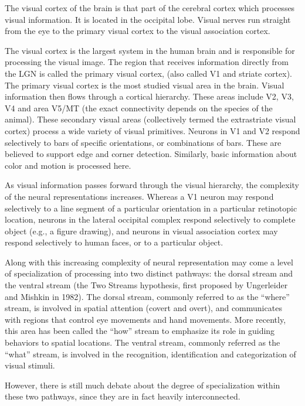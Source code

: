 \documentclass[]{book}
\begin{document}
The visual cortex of the brain is that part of the cerebral cortex which processes visual information. It is located in the occipital lobe. Visual nerves run straight from the eye to the primary visual cortex to the visual association cortex.

The visual cortex is the largest system in the human brain and is responsible for processing the visual image. The region that receives information directly from the LGN is called the primary visual cortex, (also called V1 and striate cortex). The primary visual cortex is the most studied visual area in the brain. Visual information then flows through a cortical hierarchy. These areas include V2, V3, V4 and area V5/MT (the exact connectivity depends on the species of the animal). These secondary visual areas (collectively termed the extrastriate visual cortex) process a wide variety of visual primitives. Neurons in V1 and V2 respond selectively to bars of specific orientations, or combinations of bars. These are believed to support edge and corner detection. Similarly, basic information about color and motion is processed here.

As visual information passes forward through the visual hierarchy, the complexity of the neural representations increases. Whereas a V1 neuron may respond selectively to a line segment of a particular orientation in a particular retinotopic location, neurons in the lateral occipital complex respond selectively to complete object (e.g., a figure drawing), and neurons in visual association cortex may respond selectively to human faces, or to a particular object.

Along with this increasing complexity of neural representation may come a level of specialization of processing into two distinct pathways: the dorsal stream and the ventral stream (the Two Streams hypothesis, first proposed by Ungerleider and Mishkin in 1982). The dorsal stream, commonly referred to as the ``where'' stream, is involved in spatial attention (covert and overt), and communicates with regions that control eye movements and hand movements. More recently, this area has been called the ``how'' stream to emphasize its role in guiding behaviors to spatial locations. The ventral stream, commonly referred as the ``what'' stream, is involved in the recognition, identification and categorization of visual stimuli.

However, there is still much debate about the degree of specialization within these two pathways, since they are in fact heavily interconnected.
\end{document}
